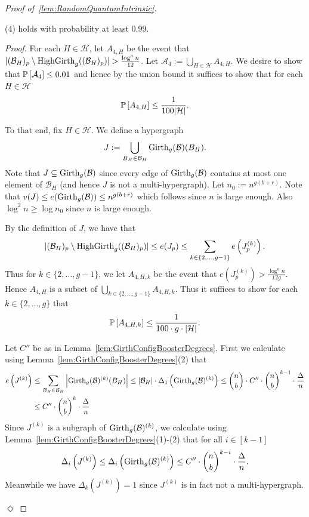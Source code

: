 \documentclass[11pt]{article}
\newcommand{\mc}[1]{\mathcal{#1}}
\newcounter{i}
\theoremstyle{plain}
\newenvironment{proofclaim}[1][]%
{\noindent \emph{Proof.} {}{#1}{}}{\hfill
	$\Diamond$\vspace{1em}}
\renewcommand{\theclaim}{\thetheorem.\arabic{claim}}
\newenvironment{lateproof}[1]
 {%
  \renewcommand{\theclaim}{\ref{#1}.\arabic{claim}}%
  \begin{proof}[Proof of~\cref{#1}]%
 }
 {\end{proof}}
\theoremstyle{plain} %
\theoremstyle{definition}
\newcommand{\Prob}[1]{\ensuremath{%
\mathbb P\left[#1\right]
}}
\begin{document}
\begin{lateproof}{lem:RandomQuantumIntrinsic}
\begin{claim}\label{cl:4Holds}
(4) holds with probability at least $0.99$.    
\end{claim}
\begin{proofclaim}
For each $H\in \mathcal{H}$, let $A_{4,H}$ be the event that $|(\mc{B}_{H})_p\setminus {\rm HighGirth}_g( (\mc{B}_{H})_p)| > \frac{\log^{a} n}{12}$.
Let $\mathcal{A}_4 := \bigcup_{H\in \mc{H}} A_{4,H}$. We desire to show that $\Prob{\mc{A}_4} \le 0.01$ and hence by the union bound it suffices to show that for each $H\in \mc{H}$
$$\Prob{A_{4,H}} \le \frac{1}{100 |\mc{H}|}.$$

To that end, fix $H \in \mathcal{H}$. We define a hypergraph 
$$J:=\bigcup_{B_H\in \mc{B}_H} {\rm Girth}_g(\mc{B})(B_H).$$
Note that $J\subseteq {\rm Girth}_g(\mc{B})$ since every edge of ${\rm Girth}_g(\mc{B})$ contains at most one element of $\mc{B}_H$ (and hence $J$ is not a multi-hypergraph). Let $n_0:= n^{g(b+r)}$. Note that $v(J) \le e({\rm Girth}_g(\mc{B})) \le n^{g(b+r)}$ which follows since $n$ is large enough. Also $\log^2 n\ge \log n_0$ since $n$ is large enough.

By the definition of $J$, we have that 
$$|(\mc{B}_{H})_p\setminus {\rm HighGirth}_g( (\mc{B}_{H})_p)| \le e(J_p) \le \sum_{k\in \{2,\ldots, g-1\}} e\left( J^{(k)}_p\right).$$
Thus for $k\in \{2,\ldots, g-1\}$, we let $A_{4,H,k}$ be the event that $e\left(J^{(k)}_p\right) > \frac{\log^{a} n}{12g}$. Hence $A_{4,H}$ is a subset of $\bigcup_{k \in \{2,\ldots, g-1\}} A_{4,H,k}$. Thus it suffices to show for each  $k\in \{2,\ldots, g\}$ that
$$\Prob{A_{4,H,k}} \le \frac{1}{100\cdot g \cdot |\mc{H}|}.$$

Let $C''$ be as in Lemma~\ref{lem:GirthConfigBoosterDegrees}. First we calculate using Lemma~\ref{lem:GirthConfigBoosterDegrees}(2) that
\begin{align*}
e\left(J^{(k)}\right) &\le \sum_{B_H\in \mc{B}_H} \left|{\rm Girth}_g(\mc{B})^{(k)}(B_H)\right|\le |\mc{B}_H|\cdot \Delta_{1}\left({\rm Girth}_g(\mc{B})^{(k)}\right) \le \binom{n}{b} \cdot C'' \cdot \binom{n}{b}^{k-1} \cdot \frac{\Delta}{n} \\
&\le C'' \cdot \binom{n}{b}^{k} \cdot \frac{\Delta}{n}
\end{align*}
Since $J^{(k)}$ is a subgraph of ${\rm Girth}_g(\mc{B})^{(k)}$, we calculate using Lemma~\ref{lem:GirthConfigBoosterDegrees}(1)-(2) that for all $i\in [k-1]$
$$\Delta_i\left(J^{(k)}\right) \le \Delta_i\left({\rm Girth}_g(\mc{B})^{(k)}\right)\le C'' \cdot \binom{n}{b}^{k-i} \cdot \frac{\Delta}{n}.$$
Meanwhile we have $\Delta_k(J^{(k)})=1$ since $J^{(k)}$ is in fact not a multi-hypergraph. 


\end{proofclaim}
\end{lateproof}
\end{document}
